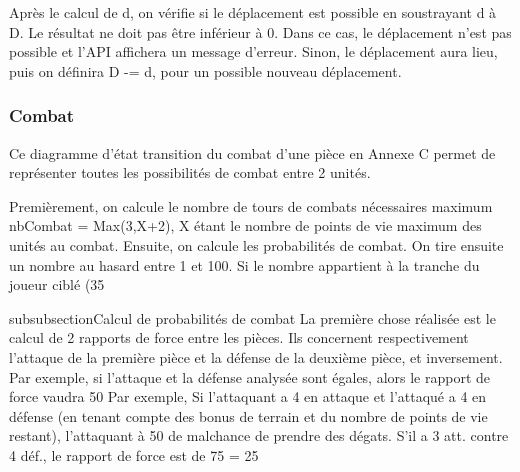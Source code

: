 Après le calcul de d, on vérifie si le déplacement est possible en soustrayant d à D. Le résultat ne doit pas être inférieur à 0. Dans ce cas, le déplacement n'est pas possible et l'API affichera un message d'erreur. Sinon, le déplacement aura lieu, puis on définira D -= d, pour un possible nouveau déplacement.

\subsubsection{Combat}
Ce diagramme d'état transition du combat d'une pièce en Annexe C permet de représenter toutes les possibilités de combat entre 2 unités. 

Premièrement, on calcule le nombre de tours de combats nécessaires maximum nbCombat = Max(3,X+2), X étant le nombre de points de vie maximum des unités au combat. Ensuite, on calcule les probabilités de combat. On tire ensuite un nombre au hasard entre 1 et 100. Si le nombre appartient à la tranche du joueur ciblé (35 %

subsubsection{Calcul de probabilités de combat}
La première chose réalisée est le calcul de 2 rapports de force entre les pièces. Ils concernent respectivement l'attaque de la première pièce et la défense de la deuxième pièce, et inversement. Par exemple, si l'attaque et la défense analysée sont égales, alors le rapport de force vaudra 50%
Par exemple, Si l’attaquant a 4 en attaque et l’attaqué a 4 en défense
(en tenant compte des bonus de terrain et du nombre de points de vie restant), l’attaquant à 50%
de malchance de prendre des dégats. S’il a 3 att. contre 4 déf., le rapport de force est de 75%
= 25%

